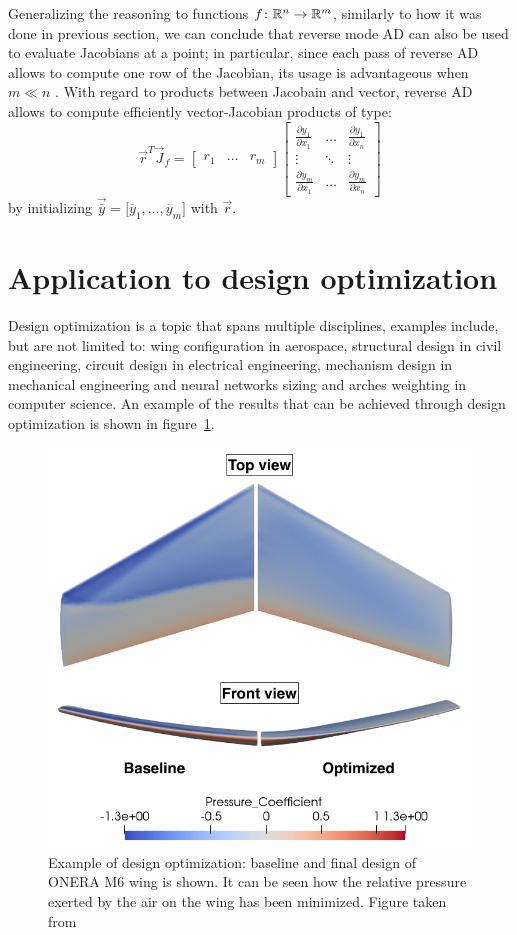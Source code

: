 Generalizing the reasoning to functions $f \colon \mathbb{R}^n \to \mathbb{R}^m$, similarly to how it was done in previous section, we can conclude that reverse mode AD can also be used to evaluate Jacobians at a point; in particular, since each pass of reverse AD allows to compute one row of the Jacobian, its usage is advantageous when $m \ll n$ .
With regard to products between Jacobain and vector, reverse AD allows to compute efficiently vector-Jacobian products of type:
\begin{equation}
	\vec{r}^T \vec{J}_f =
	\begin{bmatrix}
		r_1 	& \dots  & r_m
	\end{bmatrix}
	\begin{bmatrix}
		\frac{\partial y_1}{\partial x_1} &  \dots  & \frac{\partial y_1}{\partial x_n}  \\
		\vdots							  & \ddots  & \vdots							 \\
		\frac{\partial y_m}{\partial x_1} &  \dots  & \frac{\partial y_m}{\partial x_n}
	\end{bmatrix}
\end{equation}
by initializing $\vec{\overline{y}}=\big[\overline{y}_1, \dots, \overline{y}_m \big]$ with $\vec{r}$.




\section{Application to design optimization}
\label{sec:application_to_design_opt}

Design optimization is a topic that spans multiple disciplines, examples include, but are not limited to: wing configuration in aerospace, structural design in civil engineering, circuit design in electrical engineering, mechanism design in mechanical engineering and neural networks sizing and arches weighting in computer science.
An example of the results that can be achieved through design optimization is shown in figure~\ref{fig:wing_opt}.

\begin{figure}
	\centering
	\includegraphics[width=.5\textwidth]{img/wing_opt.png}
	\caption{Example of design optimization: baseline and final design of ONERA M6 wing is shown. It can be seen how the relative pressure exerted by the air on the wing has been minimized. Figure taken from~\cite{Bombardieri:paper_of_wing_opt_image}}
	\label{fig:wing_opt}
\end{figure}

